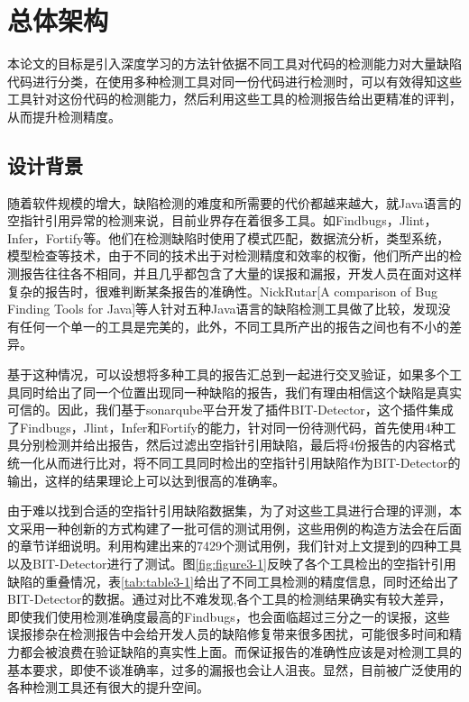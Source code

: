 \chapter{总体架构}
本论文的目标是引入深度学习的方法针依据不同工具对代码的检测能力对大量缺陷代码进行分类，在使用多种检测工具对同一份代码进行检测时，可以有效得知这些工具针对这份代码的检测能力，然后利用这些工具的检测报告给出更精准的评判，从而提升检测精度。
\section{设计背景}
随着软件规模的增大，缺陷检测的难度和所需要的代价都越来越大，就Java语言的空指针引用异常的检测来说，目前业界存在着很多工具。如Findbugs，Jlint，Infer，Fortify等。他们在检测缺陷时使用了模式匹配，数据流分析，类型系统，模型检查等技术，由于不同的技术出于对检测精度和效率的权衡，他们所产出的检测报告往往各不相同，并且几乎都包含了大量的误报和漏报，开发人员在面对这样复杂的报告时，很难判断某条报告的准确性。NickRutar[A comparison of Bug Finding Tools for Java]等人针对五种Java语言的缺陷检测工具做了比较，发现没有任何一个单一的工具是完美的，此外，不同工具所产出的报告之间也有不小的差异。

基于这种情况，可以设想将多种工具的报告汇总到一起进行交叉验证，如果多个工具同时给出了同一个位置出现同一种缺陷的报告，我们有理由相信这个缺陷是真实可信的。因此，我们基于sonarqube平台开发了插件BIT-Detector，这个插件集成了Findbugs，Jlint，Infer和Fortify的能力，针对同一份待测代码，首先使用4种工具分别检测并给出报告，然后过滤出空指针引用缺陷，最后将4份报告的内容格式统一化从而进行比对，将不同工具同时检出的空指针引用缺陷作为BIT-Detector的输出，这样的结果理论上可以达到很高的准确率。

由于难以找到合适的空指针引用缺陷数据集，为了对这些工具进行合理的评测，本文采用一种创新的方式构建了一批可信的测试用例，这些用例的构造方法会在后面的章节详细说明。利用构建出来的7429个测试用例，我们针对上文提到的四种工具以及BIT-Detector进行了测试。图\ref{fig:figure3-1}反映了各个工具检出的空指针引用缺陷的重叠情况，表\ref{tab:table3-1}给出了不同工具检测的精度信息，同时还给出了BIT-Detector的数据。通过对比不难发现,各个工具的检测结果确实有较大差异，即使我们使用检测准确度最高的Findbugs，也会面临超过三分之一的误报，这些误报掺杂在检测报告中会给开发人员的缺陷修复带来很多困扰，可能很多时间和精力都会被浪费在验证缺陷的真实性上面。而保证报告的准确性应该是对检测工具的基本要求，即使不谈准确率，过多的漏报也会让人沮丧。显然，目前被广泛使用的各种检测工具还有很大的提升空间。


